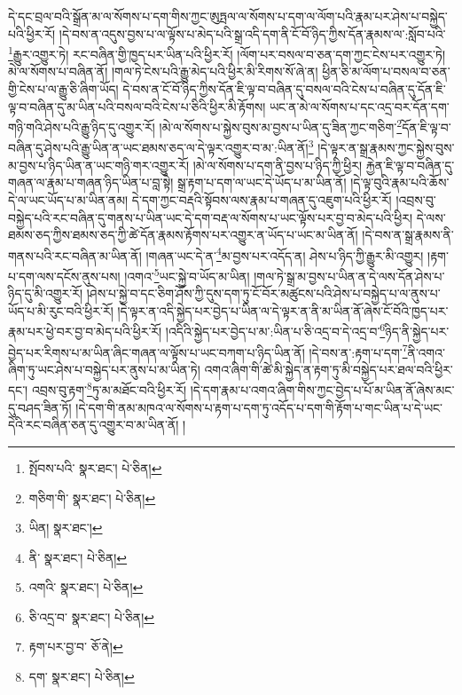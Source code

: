 དེ་དང་བྲལ་བའི་སྒྲོན་མ་ལ་སོགས་པ་དག་གིས་ཀྱང་ཨུཏྤལ་ལ་སོགས་པ་དག་ལ་ལོག་པའི་རྣམ་པར་ཤེས་པ་བསྐྱེད་པའི་ཕྱིར་རོ། །དེ་བས་ན་འདུས་བྱས་པ་ལ་ལྟོས་པ་མེད་པའི་སྒྲ་འདི་དག་ནི་ངོ་བོ་ཉིད་ཀྱིས་དོན་རྣམས་ལ་:སློབ་པའི་\footnote{སྤོབས་པའི་  སྣར་ཐང་།  པེ་ཅིན། }རྒྱུར་འགྱུར་ཏེ། རང་བཞིན་གྱི་ཁྱད་པར་ཡིན་པའི་ཕྱིར་རོ། །ལོག་པར་བསལ་བ་ཅན་དག་ཀྱང་ངེས་པར་འགྱུར་ཏེ། མེ་ལ་སོགས་པ་བཞིན་ནོ། །གལ་ཏེ་ངེས་པའི་རྒྱུ་མེད་པའི་ཕྱིར་མི་རིགས་སོ་ཞེ་ན། ཕྱིན་ཅི་མ་ལོག་པ་བསལ་བ་ཅན་གྱི་ངེས་པ་ལ་རྒྱུ་ཅི་ཞིག་ཡོད། དེ་བས་ན་ངོ་བོ་ཉིད་ཀྱིས་དོན་ཇི་ལྟ་བ་བཞིན་དུ་བསལ་བའི་ངེས་པ་བཞིན་དུ་དོན་ཇི་ལྟ་བ་བཞིན་དུ་མ་ཡིན་པའི་བསལ་བའི་ངེས་པ་ཅིའི་ཕྱིར་མི་རྟོགས། ཡང་ན་མེ་ལ་སོགས་པ་དང་འདྲ་བར་དོན་དག་གཉི་གའི་ཤེས་པའི་རྒྱུ་ཉིད་དུ་འགྱུར་རོ། །མེ་ལ་སོགས་པ་སྐྱེས་བུས་མ་བྱས་པ་ཡིན་དུ་ཟིན་ཀྱང་གཅིག་\footnote{གཅིག་གི་  སྣར་ཐང་།  པེ་ཅིན། }དོན་ཇི་ལྟ་བ་བཞིན་དུ་ཤེས་པའི་རྒྱུ་ཡིན་ན་ཡང་ཐམས་ཅད་ལ་དེ་ལྟར་འགྱུར་བ་མ་:ཡིན་ནོ།\footnote{ཡིན།  སྣར་ཐང་། } །དེ་ལྟར་ན་སྒྲ་རྣམས་ཀྱང་སྐྱེས་བུས་མ་བྱས་པ་ཉིད་ཡིན་ན་ཡང་གཉི་གར་འགྱུར་རོ། །མེ་ལ་སོགས་པ་དག་ནི་བྱས་པ་ཉིད་ཀྱི་ཕྱིར། རྐྱེན་ཇི་ལྟ་བ་བཞིན་དུ་གཞན་ལ་རྣམ་པ་གཞན་ཉིད་ཡིན་པ་བླ་སྟེ། སྒྲ་རྟག་པ་དག་ལ་ཡང་དེ་ཡོད་པ་མ་ཡིན་ནོ། །དེ་ལྟ་བུའི་རྣམ་པའི་ཆོས་དེ་ལ་ཡང་ཡོད་པ་མ་ཡིན་ནམ། དེ་དག་ཀྱང་བརྡའི་སྟོབས་ལས་རྣམ་པ་གཞན་དུ་འཇུག་པའི་ཕྱིར་རོ། །འབྲས་བུ་བསྐྱེད་པའི་རང་བཞིན་དུ་གནས་པ་ཡིན་ཡང་དེ་དག་བརྡ་ལ་སོགས་པ་ཡང་ལྟོས་པར་བྱ་བ་མེད་པའི་ཕྱིར། དེ་ལས་ཐམས་ཅད་ཀྱིས་ཐམས་ཅད་ཀྱི་ཚེ་དོན་རྣམས་རྟོགས་པར་འགྱུར་ན་ཡོད་པ་ཡང་མ་ཡིན་ནོ། །དེ་བས་ན་སྒྲ་རྣམས་ནི་གནས་པའི་རང་བཞིན་མ་ཡིན་ནོ། །གཞན་ཡང་དེ་ན་\footnote{ནི་  སྣར་ཐང་།  པེ་ཅིན། }མ་བྱས་པར་འདོད་ན། ཤེས་པ་ཉིད་ཀྱི་རྒྱུར་མི་འགྱུར། །རྟག་པ་དག་ལས་དངོས་ནུས་པས། །འགའ་\footnote{འགའི་  སྣར་ཐང་།  པེ་ཅིན། }ཡང་སྐྱེ་བ་ཡོད་མ་ཡིན། །གལ་ཏེ་སྒྲ་མ་བྱས་པ་ཡིན་ན་དེ་ལས་དོན་ཤེས་པ་ཉིད་དུ་མི་འགྱུར་རོ། །ཤེས་པ་སྐྱེ་བ་དང་ཅིག་ཤོས་ཀྱི་དུས་དག་ཏུ་ངོ་བོར་མཚུངས་པའི་ཤེས་པ་བསྐྱེད་པ་ལ་ནུས་པ་ཡོད་པ་མི་རུང་བའི་ཕྱིར་རོ། །དེ་ལྟར་ན་འདི་སྐྱེད་པར་བྱེད་པ་ཡིན་ལ་དེ་ལྟར་ན་ནི་མ་ཡིན་ནོ་ཞེས་ངོ་བོའི་ཁྱད་པར་རྣམ་པར་ཕྱེ་བར་བྱ་བ་མེད་པའི་ཕྱིར་རོ། །འདིའི་སྐྱེད་པར་བྱེད་པ་མ་:ཡིན་པ་ཅི་འདྲ་བ་དེ་འདྲ་བ་\footnote{ཅི་འདྲ་བ་  སྣར་ཐང་།  པེ་ཅིན། }ཉིད་ནི་སྐྱེད་པར་བྱེད་པར་རིགས་པ་མ་ཡིན་ཞིང་གཞན་ལ་ལྟོས་པ་ཡང་བཀག་པ་ཉིད་ཡིན་ནོ། །དེ་བས་ན་:རྟག་པ་དག་\footnote{རྟག་པར་བྱ་བ་  ཅོ་ནེ། }ནི་འགའ་ཞིག་ཏུ་ཡང་ཤེས་པ་བསྐྱེད་པར་ནུས་པ་མ་ཡིན་ཏེ། འགའ་ཞིག་གི་ཚེ་མི་སྐྱེད་ན་རྟག་ཏུ་མི་བསྐྱེད་པར་ཐལ་བའི་ཕྱིར་དང་། འབྲས་བུ་རྟག་\footnote{དག་  སྣར་ཐང་།  པེ་ཅིན། }ཏུ་མ་མཐོང་བའི་ཕྱིར་རོ། །དེ་དག་རྣམ་པ་འགའ་ཞིག་གིས་ཀྱང་བྱེད་པ་པོ་མ་ཡིན་ནོ་ཞེས་མང་དུ་བཤད་ཟིན་ཏོ། །དེ་དག་གི་ནམ་མཁའ་ལ་སོགས་པ་རྟག་པ་དག་ཏུ་འདོད་པ་དག་གི་རྟོག་པ་གང་ཡིན་པ་དེ་ཡང་དེའི་རང་བཞིན་ཅན་དུ་འགྱུར་བ་མ་ཡིན་ནོ། །
